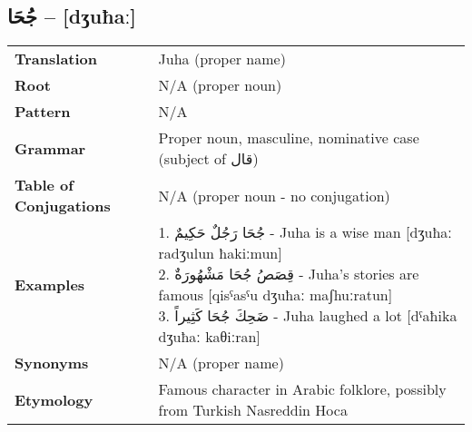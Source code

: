\documentclass[a4paper,12pt]{article}
\begin{document}
\subsection{\textarabic{جُحَا} – [dʒuħaː]}
\begin{tabular}{p{3cm}p{10cm}}
\toprule
\textbf{Translation} & Juha (proper name) \\
\textbf{Root} & N/A (proper noun) \\
\textbf{Pattern} & N/A \\
\textbf{Grammar} & Proper noun, masculine, nominative case (subject of \textarabic{قال}) \\
\textbf{Table of Conjugations} & N/A (proper noun - no conjugation) \\
\textbf{Examples} & \makecell[l]{\parbox{9.5cm}{
1. \textarabic{جُحَا رَجُلٌ حَكِيمٌ} - Juha is a wise man [dʒuħaː radʒulun ħakiːmun]\\
2. \textarabic{قِصَصُ جُحَا مَشْهُورَةٌ} - Juha's stories are famous [qisˤasˤu dʒuħaː maʃhuːratun]\\
3. \textarabic{ضَحِكَ جُحَا كَثِيراً} - Juha laughed a lot [dˤaħika dʒuħaː kaθiːran]
}} \\
\textbf{Synonyms} & N/A (proper name) \\
\textbf{Etymology} & Famous character in Arabic folklore, possibly from Turkish Nasreddin Hoca \\
\bottomrule
\end{tabular}
\end{document}
